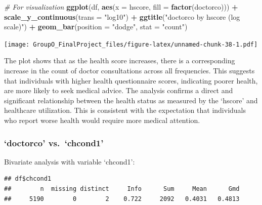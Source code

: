 \documentclass[
]{article}
\newenvironment{Shaded}{\begin{snugshade}}{\end{snugshade}}
\newcommand{\AttributeTok}[1]{\textcolor[rgb]{0.13,0.29,0.53}{#1}}
\newcommand{\CommentTok}[1]{\textcolor[rgb]{0.56,0.35,0.01}{\textit{#1}}}
\newcommand{\FunctionTok}[1]{\textcolor[rgb]{0.13,0.29,0.53}{\textbf{#1}}}
\newcommand{\NormalTok}[1]{#1}
\newcommand{\SpecialCharTok}[1]{\textcolor[rgb]{0.81,0.36,0.00}{\textbf{#1}}}
\newcommand{\StringTok}[1]{\textcolor[rgb]{0.31,0.60,0.02}{#1}}
\begin{document}
\begin{Shaded}
\begin{Highlighting}[]
\CommentTok{\# For visualization}
\FunctionTok{ggplot}\NormalTok{(df, }\FunctionTok{aes}\NormalTok{(}\AttributeTok{x =}\NormalTok{ hscore, }\AttributeTok{fill =} \FunctionTok{factor}\NormalTok{(doctorco))) }\SpecialCharTok{+} 
  \FunctionTok{scale\_y\_continuous}\NormalTok{(}\AttributeTok{trans =} \StringTok{"log10"}\NormalTok{) }\SpecialCharTok{+}
  \FunctionTok{ggtitle}\NormalTok{(}\StringTok{"\textquotesingle{}doctorco\textquotesingle{} by \textquotesingle{}hscore\textquotesingle{} (log scale)"}\NormalTok{) }\SpecialCharTok{+}
  \FunctionTok{geom\_bar}\NormalTok{(}\AttributeTok{position =} \StringTok{"dodge"}\NormalTok{, }\AttributeTok{stat =} \StringTok{"count"}\NormalTok{)}
\end{Highlighting}
\end{Shaded}

\texttt{[image: GroupO\_FinalProject\_files/figure-latex/unnamed-chunk-38-1.pdf]}

The plot shows that as the health score increases, there is a
corresponding increase in the count of doctor consultations across all
frequencies. This suggests that individuals with higher health
questionnaire scores, indicating poorer health, are more likely to seek
medical advice. The analysis confirms a direct and significant
relationship between the health status as measured by the `hscore' and
healthcare utilization. This is consistent with the expectation that
individuals who report worse health would require more medical
attention.

\subsubsection{`doctorco' vs.~`chcond1'}\label{doctorco-vs.-chcond1}

Bivariate analysis with variable `chcond1':

\begin{Shaded}
\end{Shaded}

\begin{verbatim}
## df$chcond1 
##        n  missing distinct     Info      Sum     Mean      Gmd 
##     5190        0        2    0.722     2092   0.4031   0.4813
\end{verbatim}
\end{document}
